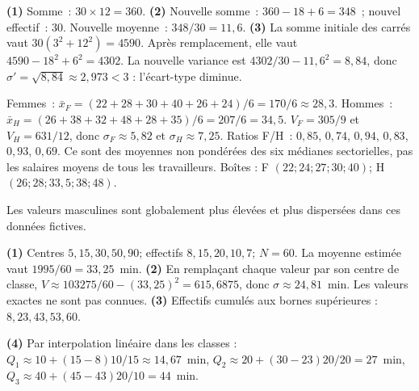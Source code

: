 
\textbf{(1)} Somme~: $30\times12=360$.
\textbf{(2)} Nouvelle somme~: $360-18+6=348$~; nouvel effectif~: $30$.
Nouvelle moyenne~: $348/30=11{,}6$.
\textbf{(3)} La somme initiale des carr\'es vaut $30(3^2+12^2)=4590$.
Apr\`es remplacement, elle vaut $4590-18^2+6^2=4302$.
La nouvelle variance est $4302/30-11{,}6^2=8{,}84$,
donc $\sigma'=\sqrt{8{,}84}\approx2{,}973<3$ : l'\'ecart-type diminue.


Femmes~: $\bar{x}_F=(22+28+30+40+26+24)/6=170/6\approx28{,}3$.
Hommes~: $\bar{x}_H=(26+38+32+48+28+35)/6=207/6=34{,}5$.
$V_F=305/9$ et $V_H=631/12$, donc $\sigma_F\approx5{,}82$ et $\sigma_H\approx7{,}25$.
Ratios F/H~: $0{,}85$, $0{,}74$, $0{,}94$, $0{,}83$, $0{,}93$, $0{,}69$.
Ce sont des moyennes non pond\'er\'ees des six m\'edianes sectorielles,
pas les salaires moyens de tous les travailleurs.
Bo\^ites : F $(22;24;27;30;40)$; H $(26;28;33{,}5;38;48)$.
\begin{center}
\end{center}
Les valeurs masculines sont globalement plus \'elev\'ees et plus dispers\'ees dans ces donn\'ees fictives.


\textbf{(1)} Centres $5,15,30,50,90$; effectifs $8,15,20,10,7$; $N=60$.
La moyenne estim\'ee vaut $1995/60=33{,}25$~min.
\textbf{(2)} En rempla\c cant chaque valeur par son centre de classe,
$V\approx103275/60-(33{,}25)^2=615{,}6875$,
donc $\sigma\approx24{,}81$~min. Les valeurs exactes ne sont pas connues.
\textbf{(3)} Effectifs cumul\'es aux bornes sup\'erieures : $8,23,43,53,60$.
\begin{center}
\end{center}
\textbf{(4)} Par interpolation lin\'eaire dans les classes :
$Q_1\approx10+(15-8)10/15\approx14{,}67$~min,
$Q_2\approx20+(30-23)20/20=27$~min,
$Q_3\approx40+(45-43)20/10=44$~min.

